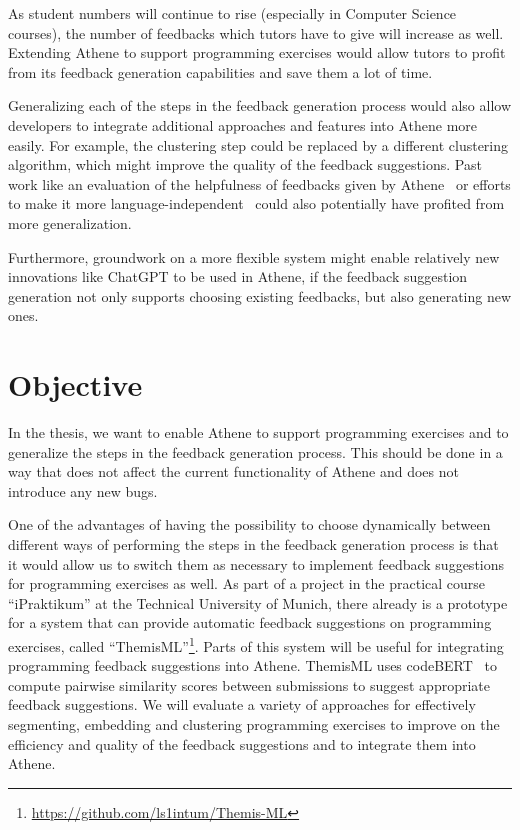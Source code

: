 As student numbers will continue to rise (especially in Computer Science courses), the number of feedbacks which tutors have to give will increase as well. Extending Athene to support programming exercises would allow tutors to profit from its feedback generation capabilities and save them a lot of time.

Generalizing each of the steps in the feedback generation process would also allow developers to integrate additional approaches and features into Athene more easily.
For example, the clustering step could be replaced by a different clustering algorithm, which might improve the quality of the feedback suggestions. Past work like an evaluation of the helpfulness of feedbacks given by Athene~\cite{atheneTracking} or efforts to make it more language-independent~\cite{atheneLanguage} could also potentially have profited from more generalization.

Furthermore, groundwork on a more flexible system might enable relatively new innovations like ChatGPT to be used in Athene, if the feedback suggestion generation not only supports choosing existing feedbacks, but also generating new ones.

\section*{Objective}
In the thesis, we want to enable Athene to support programming exercises and to generalize the steps in the feedback generation process. This should be done in a way that does not affect the current functionality of Athene and does not introduce any new bugs.

One of the advantages of having the possibility to choose dynamically between different ways of performing the steps in the feedback generation process is that it would allow us to switch them as necessary to implement feedback suggestions for programming exercises as well. 
As part of a project in the practical course \enquote{iPraktikum} at the Technical University of Munich, there already is a prototype for a system that can provide automatic feedback suggestions on programming exercises, called \enquote{ThemisML}\footnote{\url{https://github.com/ls1intum/Themis-ML}}. 
Parts of this system will be useful for integrating programming feedback suggestions into Athene. ThemisML uses codeBERT~\cite{codeBERT} to compute pairwise similarity scores between submissions to suggest appropriate feedback suggestions. We will evaluate a variety of approaches for effectively segmenting, embedding and clustering programming exercises to improve on the efficiency and quality of the feedback suggestions and to integrate them into Athene.

